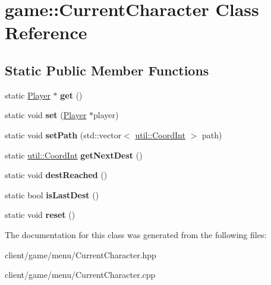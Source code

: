 \hypertarget{classgame_1_1_current_character}{\section{game\-:\-:Current\-Character Class Reference}
\label{classgame_1_1_current_character}
}
\subsection*{Static Public Member Functions}
\begin{DoxyCompactItemize}
\item 
\hypertarget{classgame_1_1_current_character_acaac3d70ca23f281f4453a5e06f649e3}{static \hyperlink{classgame_1_1_player}{Player} $\ast$ {\bfseries get} ()}\label{classgame_1_1_current_character_acaac3d70ca23f281f4453a5e06f649e3}

\item 
\hypertarget{classgame_1_1_current_character_afa03985480a94c46476aa483d7b80f4b}{static void {\bfseries set} (\hyperlink{classgame_1_1_player}{Player} $\ast$player)}\label{classgame_1_1_current_character_afa03985480a94c46476aa483d7b80f4b}

\item 
\hypertarget{classgame_1_1_current_character_ae0659a139ea41c0a0fe110bbc5821e1a}{static void {\bfseries set\-Path} (std\-::vector$<$ \hyperlink{classutil_1_1_coordinates}{util\-::\-Coord\-Int} $>$ path)}\label{classgame_1_1_current_character_ae0659a139ea41c0a0fe110bbc5821e1a}

\item 
\hypertarget{classgame_1_1_current_character_a1f81569ef85d1e32450f2889ce56c81b}{static \hyperlink{classutil_1_1_coordinates}{util\-::\-Coord\-Int} {\bfseries get\-Next\-Dest} ()}\label{classgame_1_1_current_character_a1f81569ef85d1e32450f2889ce56c81b}

\item 
\hypertarget{classgame_1_1_current_character_a07823e6c3688b103b5adbbc5f8ca58bf}{static void {\bfseries dest\-Reached} ()}\label{classgame_1_1_current_character_a07823e6c3688b103b5adbbc5f8ca58bf}

\item 
\hypertarget{classgame_1_1_current_character_af52095308e1c7af4d97fb0070900481e}{static bool {\bfseries is\-Last\-Dest} ()}\label{classgame_1_1_current_character_af52095308e1c7af4d97fb0070900481e}

\item 
\hypertarget{classgame_1_1_current_character_af8d76b4de49ed9959767bef4df532980}{static void {\bfseries reset} ()}\label{classgame_1_1_current_character_af8d76b4de49ed9959767bef4df532980}

\end{DoxyCompactItemize}


The documentation for this class was generated from the following files\-:\begin{DoxyCompactItemize}
\item 
client/game/menu/Current\-Character.\-hpp\item 
client/game/menu/Current\-Character.\-cpp\end{DoxyCompactItemize}
